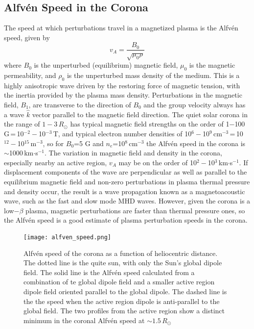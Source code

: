\subsection{Alfv\'{e}n Speed in the Corona}
The speed at which perturbations travel in a magnetized plasma is the Alfv\'{e}n speed, given by
\begin{equation}
v_A = \frac{B_0}{\sqrt{\mu_0 \rho}}
\end{equation}
where $B_{0}$ is the unperturbed (equilibrium) magnetic field, $\mu_{0}$ is the magnetic permeability, and $\rho_{0}$ is the unperturbed mass density of the medium. This is a highly anisotropic wave driven by the restoring force of magnetic tension, with the inertia provided by the plasma mass density. Perturbations in the magnetic field, $B_{1}$, are transverse to the direction of $B_0$ and the group velocity always has a wave $\hat{k}$ vector parallel to the magnetic field direction. The quiet solar corona in the range of $1-3$\,$R_{\odot}$ has typical magnetic field strengths on the order of 1$-$100\,G\,=\,10$^{-2}-$10$^{-3}$\,T, and typical electron number densities of 10$^{6} -$10$^{9}$\,cm$^{-3}$\,=\,10$^{12}-$10$^{15}$\,m$^{-3}$, so for $B_0$=5 G and $n_e$=10$^{8}$\,cm$^{-3}$ the Alfv\'{e}n speed in the corona is $\sim$1000\,km$\cdot$s$^{-1}$. The variation in magnetic field and density in the corona, especially nearby an active region, $v_{A}$ may be on the order of 10$^{2}-$10$^{3}$\,km$\cdot$s$^{-1}$. If displacement components of the wave are perpendicular as well as parallel to the equilibrium magnetic field and non-zero perturbations in plasma thermal pressure and density occur, the result is a wave propagation known as a magnetoacoustic wave, such as the fast and slow mode MHD waves. However, given the corona is a low$-\beta$ plasma, magnetic perturbations are faster than thermal pressure ones, so the Alfv\'{e}n speed is a good estimate of plasma perturbation speeds in the corona.
\begin{figure}
\begin{center}
\texttt{[image: alfven\_speed.png]}
\caption[Model of the Aflv\'{e}n speed as a function of height in the corona]{Alfv\'{e}n speed of the corona as a function of heliocentric distance. The dotted line is the quite sun, with only the Sun's global dipole field. The solid line is the Alfv\'{e}n speed calculated from a combination of te global dipole field and a smaller active region dipole field oriented parallel to the global dipole. The dashed line is the the speed when the active region dipole is anti-parallel to the global field. The two profiles from the active region show a distinct minimum in the coronal Alfv\'{e}n speed at $\sim1.5\,R_{\odot}$}
\label{fig:alfven_speed}
\end{center}
\end{figure}
